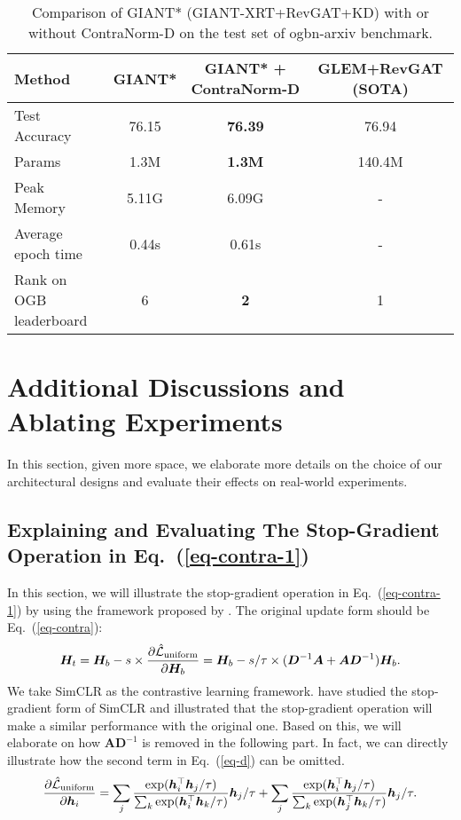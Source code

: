 \documentclass{article}
\def\vh{{\bm{h}}}
\def\mA{{\bm{A}}}
\def\mD{{\bm{D}}}
\def\mH{{\bm{H}}}
\newcommand{\Ls}{\mathcal{L}}
\theoremstyle{definition}
\theoremstyle{remark}
\theoremstyle{theorem}
\begin{document}
\begin{table}[h]
	\centering
	\caption{Comparison of GIANT* (GIANT-XRT+RevGAT+KD) with or without ContraNorm-D on the test set of ogbn-arxiv benchmark. } 
	\begin{tabular}{l cc|c}
		\toprule
		\textbf{Method} & GIANT* & GIANT* + ContraNorm-D & GLEM+RevGAT (SOTA) \\
		\midrule
		Test Accuracy & 76.15 & \textbf{76.39} & 76.94 \\
            Params & 1.3M & \textbf{1.3M} & 140.4M \\
            Peak Memory & 5.11G & 6.09G & - \\
            Average epoch time & 0.44s & 0.61s & - \\
		Rank on OGB leaderboard &  6 & \textbf{2} & 1 \\
  \bottomrule    
	\end{tabular}
	\label{table:cn-d}
\end{table}


\section{Additional Discussions and Ablating Experiments}

In this section, given more space, we elaborate more details on the choice of our architectural designs and evaluate their effects on real-world experiments.

\subsection{Explaining and Evaluating The Stop-Gradient Operation in Eq.~(\ref{eq-contra-1})}
\label{stop-gradient}
In this section, we will illustrate the stop-gradient operation in Eq.~(\ref{eq-contra-1}) by using the framework proposed by \cite{tao2022exploring}. The original update form should be Eq.~(\ref{eq-contra}):
\begin{equation*}
    \mH_t = \mH_b - s\times\frac{\partial \hat{\Ls}_{\rm{uniform}}}{\partial \mH_b}=\mH_b - s/\tau \times (\mD^{-1}\mA + \mA\mD^{-1})\mH_b.
\end{equation*}
We take SimCLR \citep{chen2020simple} as the contrastive learning framework. \cite{tao2022exploring} have studied the stop-gradient form of SimCLR and illustrated that the stop-gradient operation will make a similar performance with the original one. Based on this, we will elaborate on how $\mathbf{A}\mathbf{D}^{-1}$ is removed in the following part. In fact, we can directly illustrate how the second term in Eq.~(\ref{eq-d}) can be omitted.
\begin{equation*}
    \frac{\partial \hat{\Ls}_{\rm{uniform}}}{\partial \vh_i} 
    = \sum_j \frac{\exp(\vh_i^{\top} \vh_j/\tau)}{\sum_k \exp(\vh_i^{\top} \vh_k/\tau)} \vh_j/\tau + \sum_j \frac{\exp(\vh_i ^{\top}\vh_j/\tau)}{\sum_k \exp(\vh_j ^{\top}\vh_k/\tau)} \vh_j/\tau.
\end{equation*}
\end{document}
